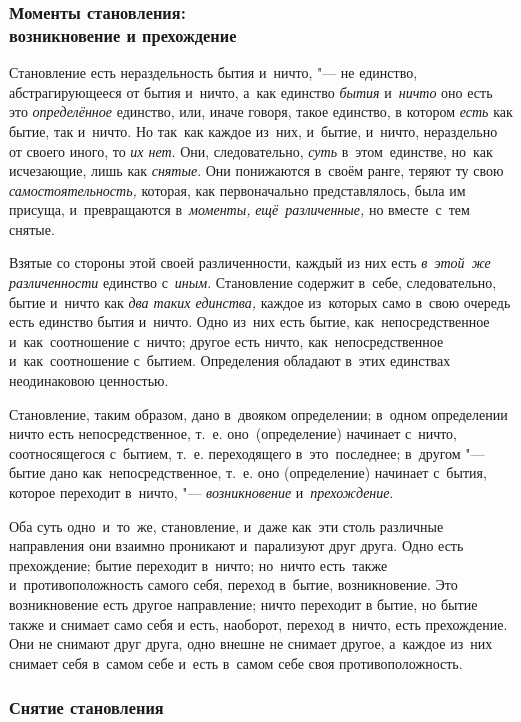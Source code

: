 \subsubsection[Моменты становления: возникновение и прехождение]%
{Моменты становления:\\возникновение и прехождение}

Становление есть нераздельность бытия и~ничто, "--- не единство,
абстрагирующееся от бытия и~ничто, а~как единство {\em бытия} и~{\em ничто} оно
есть это {\em определённое} единство, или, иначе говоря, такое единство, в
котором {\em есть} как бытие, так и~ничто. Но так~как каждое из~них, и~бытие,
и~ничто, нераздельно от своего иного, то {\em их нет}. Они, следовательно,
{\em суть} в~этом~единстве, но~как исчезающие, лишь как {\em снятые}. Они
понижаются в~своём ранге, теряют ту свою {\em самостоятельность,} которая, как
первоначально представлялось, была им присуща, и~превращаются в~{\em моменты,}
{\em ещё~различенные,} но вместе~с~тем снятые.

Взятые со стороны этой своей различенности, каждый из них есть
{\em в~этой~же различенности} единство с~{\em иным}. Становление содержит
в~себе, следовательно, бытие и~ничто как {\em два таких единства,} каждое из~которых
само в~свою очередь есть единство бытия и~ничто. Одно из~них есть бытие,
как~непосредственное и~как~соотношение с~ничто; другое есть ничто,
как~непосредственное и~как~соотношение с~бытием. Определения обладают в~этих
единствах неодинаковою ценностью.

Становление, таким образом, дано в~двояком определении; в~одном определении
ничто есть непосредственное, т.~е. оно~(определение) начинает с~ничто,
соотносящегося с~бытием, т.~е. переходящего в~это~последнее; в~другом "---
бытие дано как~непосредственное, т.~е. оно (определение) начинает с~бытия,
которое переходит в~ничто, "--- {\em возникновение} и~{\em прехождение}.

Оба суть одно~и~то~же, становление, и~даже как~эти столь различные направления
они взаимно проникают и~парализуют друг друга. Одно есть прехождение; бытие
переходит в~ничто; но~ничто есть~также и~противоположность самого себя, переход
в~бытие, возникновение. Это возникновение есть другое направление; ничто
переходит в бытие, но бытие также и снимает само себя и есть, наоборот, переход
в~ничто, есть прехождение. Они не снимают друг друга, одно внешне не снимает
другое, а~каждое из~них снимает себя в~самом себе и~есть в~самом себе своя
противоположность.

\subsubsection{Снятие становления}

